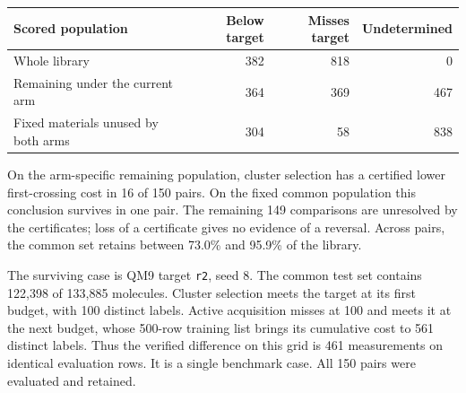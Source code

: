 \begin{center}
\begin{tabular}{@{}lrrr@{}}
\toprule
Scored population & Below target & Misses target & Undetermined\\
\midrule
Whole library & 382 & 818 & 0\\
Remaining under the current arm & 364 & 369 & 467\\
Fixed materials unused by both arms & 304 & 58 & 838\\
\bottomrule
\end{tabular}
\end{center}

On the arm-specific remaining population, cluster selection has a certified lower first-crossing cost in 16 of 150 pairs. On the fixed common population this conclusion survives in one pair. The remaining 149 comparisons are unresolved by the certificates; loss of a certificate gives no evidence of a reversal. Across pairs, the common set retains between 73.0\% and 95.9\% of the library.

The surviving case is QM9 target \texttt{r2}, seed 8. The common test set contains 122,398 of 133,885 molecules. Cluster selection meets the target at its first budget, with 100 distinct labels. Active acquisition misses at 100 and meets it at the next budget, whose 500-row training list brings its cumulative cost to 561 distinct labels. Thus the verified difference on this grid is 461 measurements on identical evaluation rows. It is a single benchmark case. All 150 pairs were evaluated and retained.
